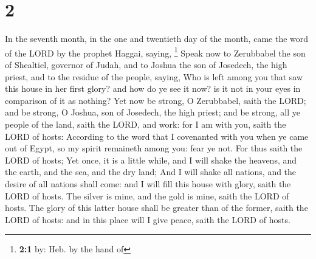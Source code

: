 \hypertarget{section-1}{%
\section{2}\label{section-1}}

 In the seventh month, in the one and twentieth day of the
month, came the word of the LORD by the prophet Haggai, saying,
\footnote{\textbf{2:1} by: Heb. by the hand of}  Speak now
to Zerubbabel the son of Shealtiel, governor of Judah, and to Joshua the
son of Josedech, the high priest, and to the residue of the people,
saying,  Who is left among you that saw this house in her
first glory? and how do ye see it now? is it not in your eyes in
comparison of it as nothing?  Yet now be strong, O
Zerubbabel, saith the LORD; and be strong, O Joshua, son of Josedech,
the high priest; and be strong, all ye people of the land, saith the
LORD, and work: for I am with you, saith the LORD of hosts:
 According to the word that I covenanted with you when ye
came out of Egypt, so my spirit remaineth among you: fear ye not.
 For thus saith the LORD of hosts; Yet once, it is a
little while, and I will shake the heavens, and the earth, and the sea,
and the dry land;  And I will shake all nations, and the
desire of all nations shall come: and I will fill this house with glory,
saith the LORD of hosts.  The silver is mine, and the gold
is mine, saith the LORD of hosts.  The glory of this
latter house shall be greater than of the former, saith the LORD of
hosts: and in this place will I give peace, saith the LORD of hosts.

